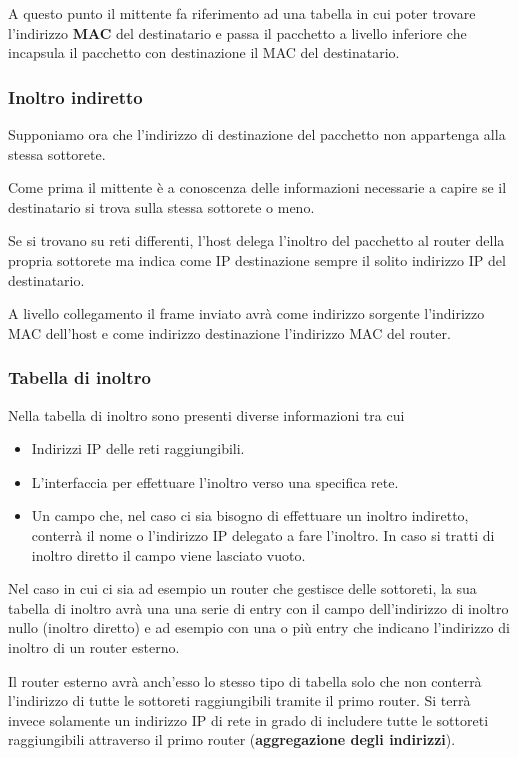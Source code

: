 A questo punto il mittente fa riferimento ad una tabella in cui poter
trovare l'indirizzo \textbf{MAC} del destinatario e passa il pacchetto
a livello inferiore che incapsula il pacchetto con destinazione il 
MAC del destinatario.

\subsubsection{Inoltro indiretto}
Supponiamo ora che l'indirizzo di destinazione del pacchetto non 
appartenga alla stessa sottorete.

Come prima il mittente è a conoscenza delle informazioni necessarie a
capire se il destinatario si trova sulla stessa sottorete o meno.

Se si trovano su reti differenti, l'host delega l'inoltro del pacchetto
al router della propria sottorete ma indica come IP destinazione sempre
il solito indirizzo IP del destinatario.

A livello collegamento il frame inviato avrà come indirizzo sorgente
l'indirizzo MAC dell'host e come indirizzo destinazione l'indirizzo MAC
del router.

\subsubsection{Tabella di inoltro}
Nella tabella di inoltro sono presenti diverse informazioni tra cui
\begin{itemize}
	\item Indirizzi IP delle reti raggiungibili.
	\item L'interfaccia per effettuare l'inoltro verso una specifica
		rete.
	\item Un campo che, nel caso ci sia bisogno di effettuare un 
		inoltro indiretto, conterrà il nome o l'indirizzo IP delegato
		a fare l'inoltro. In caso si tratti di inoltro diretto il campo
		viene lasciato vuoto.
\end{itemize}
Nel caso in cui ci sia ad esempio un router che gestisce delle 
sottoreti, la sua tabella di inoltro avrà una una serie di entry con
il campo dell'indirizzo di inoltro nullo (inoltro diretto) e ad esempio
con una o più entry che indicano l'indirizzo di inoltro di un router
esterno.

Il router esterno avrà anch'esso lo stesso tipo di tabella solo che 
non conterrà l'indirizzo di tutte le sottoreti raggiungibili tramite
il primo router. Si terrà invece solamente un indirizzo IP di rete in
grado di includere tutte le sottoreti raggiungibili attraverso il primo
router (\textbf{aggregazione degli indirizzi}).

